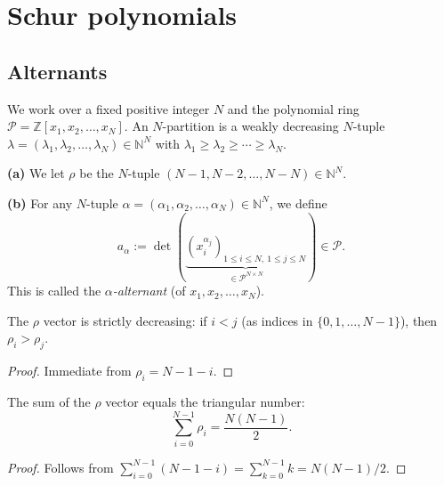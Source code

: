\section{Schur polynomials}

\subsection{Alternants}

We work over a fixed positive integer $N$ and the polynomial ring
$\mathcal{P} = \mathbb{Z}[x_1, x_2, \ldots, x_N]$.
An $N$-partition is a weakly decreasing $N$-tuple
$\lambda = (\lambda_1, \lambda_2, \ldots, \lambda_N) \in \mathbb{N}^N$
with $\lambda_1 \geq \lambda_2 \geq \cdots \geq \lambda_N$.

\begin{definition}
\label{def.sf.alternants}
\leantarget
\leanok
\textbf{(a)} We let $\rho$ be the $N$-tuple $\left(
N-1,N-2,\ldots,N-N\right)  \in\mathbb{N}^{N}$. \medskip

\textbf{(b)} For any $N$-tuple $\alpha=\left(  \alpha_{1},\alpha_{2}%
,\ldots,\alpha_{N}\right)  \in\mathbb{N}^{N}$, we define%
\[
a_{\alpha}:=\det\left(  \underbrace{\left(  x_{i}^{\alpha_{j}}\right)  _{1\leq
i\leq N,\ 1\leq j\leq N}}_{\in\mathcal{P}^{N\times N}}\right)  \in
\mathcal{P}.
\]
This is called the $\alpha$\emph{-alternant} (of $x_{1},x_{2},\ldots,x_{N}$).
\end{definition}

\begin{lemma}
\label{lem.sf.rhoVector-strictAnti}
\leanhelper
\leanok
The $\rho$ vector is strictly decreasing: if $i < j$ (as indices in $\{0, 1, \ldots, N{-}1\}$),
then $\rho_i > \rho_j$.
\end{lemma}

\begin{proof}
\leanok
Immediate from $\rho_i = N - 1 - i$.
\end{proof}

\begin{lemma}
\label{lem.sf.rhoVector-sum}
\leanhelper
\leanok
The sum of the $\rho$ vector equals the triangular number:
\[
  \sum_{i=0}^{N-1} \rho_i = \frac{N(N-1)}{2}.
\]
\end{lemma}

\begin{proof}
\leanok
Follows from $\sum_{i=0}^{N-1}(N-1-i) = \sum_{k=0}^{N-1} k = N(N-1)/2$.
\end{proof}

